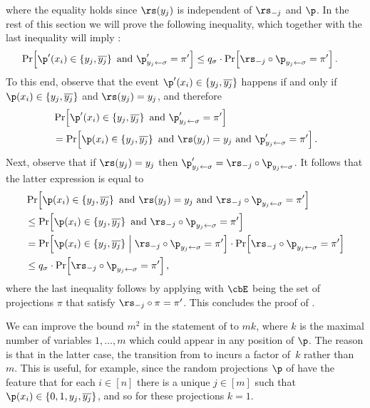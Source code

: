 where the equality holds since $\rs(y_{j})$ is independent of $\rs_{-j}$
and $\p$. In the rest of this section we will prove the following
inequality, which together with the last inequality will imply :
\begin{align}
\Pr\!\left[\p'(x_{i})\in\left\{ y_{j},\overline{y_{j}}\right\} \text{ and }\p_{y_{j}\gets\sigma}'=\pi'\right] & \le q_{\sigma}\cdot\Pr\!\left[\rs_{-j}\circ\p_{y_{j}\gets\sigma}=\pi'\right].\label{eq:shrinkage-hiding-auxiliary-goal}
\end{align}
To this end, observe that the event $\p'(x_{i})\in\left\{ y_{j},\overline{y_{j}}\right\} $
happens if and only if $\p(x_{i})\in\left\{ y_{j},\overline{y_{j}}\right\} $
and $\rs(y_{j})=y_{j}$, and therefore 
\begin{align*}
 & \Pr\!\left[\p'(x_{i})\in\left\{ y_{j},\overline{y_{j}}\right\} \text{ and }\p_{y_{j}\gets\sigma}'=\pi'\right]\\
 & =\Pr\!\left[\p(x_{i})\in\left\{ y_{j},\overline{y_{j}}\right\} \text{ and }\rs(y_{j})=y_{j}\text{ and }\p_{y_{j}\gets\sigma}'=\pi'\right].
\end{align*}
Next, observe that if $\rs(y_{j})=y_{j}$ then $\p_{y_{j}\gets\sigma}'=\rs_{-j}\circ\p_{y_{j}\gets\sigma}$.
It follows that the latter expression is equal to 
\begin{align*}
 & \Pr\!\left[\p(x_{i})\in\left\{ y_{j},\overline{y_{j}}\right\} \text{ and }\rs(y_{j})=y_{j}\text{ and }\rs_{-j}\circ\p_{y_{j}\gets\sigma}=\pi'\right]\\
 & \le\Pr\!\left[\p(x_{i})\in\left\{ y_{j},\overline{y_{j}}\right\} \text{ and }\rs_{-j}\circ\p_{y_{j}\gets\sigma}=\pi'\right]\\
 & =\Pr\!\left[\p(x_{i})\in\left\{ y_{j},\overline{y_{j}}\right\} \;\middle|\;\rs_{-j}\circ\p_{y_{j}\gets\sigma}=\pi'\right]\cdot\Pr\!\left[\rs_{-j}\circ\p_{y_{j}\gets\sigma}=\pi'\right]\\
 & \le q_{\sigma}\cdot\Pr\!\left[\rs_{-j}\circ\p_{y_{j}\gets\sigma}=\pi'\right],
\end{align*}
where the last inequality follows by applying 
with $\cbE$ being the set of projections $\pi$ that satisfy $\rs_{-j}\circ\pi=\pi'$.
This concludes the proof of .
\begin{remark}
We can improve the bound $m^{2}$ in the statement of 
to $mk$, where $k$ is the maximal number of variables $1,\ldots,m$
which could appear in any position of $\p$. The reason is that in
the latter case, the transition from 
to  incurs a factor
of~$k$ rather than~$m$. This is useful, for example, since the
random projections $\p$ of  have the feature that
for each $i\in[n]$ there is a unique $j\in[m]$ such that $\p(x_{i})\in\{0,1,y_{j},\overline{y_{j}}\}$,
and so for these projections $k=1$. 
\end{remark}



